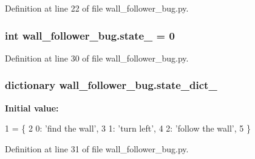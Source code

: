 Definition at line 22 of file wall\+\_\+follower\+\_\+bug.\+py.

\subsubsection[{\texorpdfstring{state\+\_\+}{state_}}]{\setlength{\rightskip}{0pt plus 5cm}int wall\+\_\+follower\+\_\+bug.\+state\+\_\+ = 0}\hypertarget{namespacewall__follower__bug_a867cf414a3d42354a718497573927c3f}{}\label{namespacewall__follower__bug_a867cf414a3d42354a718497573927c3f}


Definition at line 30 of file wall\+\_\+follower\+\_\+bug.\+py.

\subsubsection[{\texorpdfstring{state\+\_\+dict\+\_\+}{state_dict_}}]{\setlength{\rightskip}{0pt plus 5cm}dictionary wall\+\_\+follower\+\_\+bug.\+state\+\_\+dict\+\_\+}\hypertarget{namespacewall__follower__bug_ac57f08afcea951e9b48786db2bda0516}{}\label{namespacewall__follower__bug_ac57f08afcea951e9b48786db2bda0516}
{\bfseries Initial value\+:}
\begin{DoxyCode}
1 = \{
2     0: \textcolor{stringliteral}{'find the wall'},
3     1: \textcolor{stringliteral}{'turn left'},
4     2: \textcolor{stringliteral}{'follow the wall'},
5 \}
\end{DoxyCode}


Definition at line 31 of file wall\+\_\+follower\+\_\+bug.\+py.

